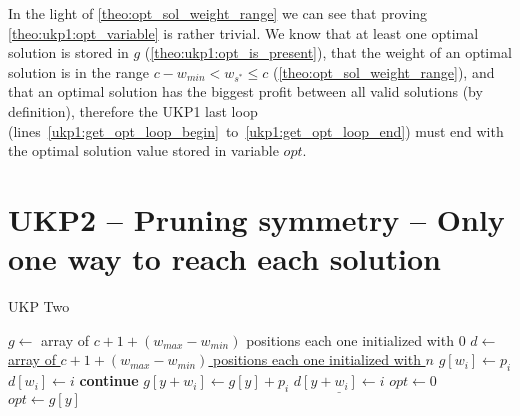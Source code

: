 \documentclass[12pt]{article}
\begin{document}
In the light of \autoref{theo:opt_sol_weight_range} we can see that proving \autoref{theo:ukp1:opt_variable} is rather trivial. We know that at least one optimal solution is stored in \(g\) (\autoref{theo:ukp1:opt_is_present}), that the weight of an optimal solution is in the range \(c - w_{min} < w_{s^*} \leq c\) (\autoref{theo:opt_sol_weight_range}), and that an optimal solution has the biggest profit between all valid solutions (by definition), therefore the UKP1 last loop (lines~\ref{ukp1:get_opt_loop_begin}~to~\ref{ukp1:get_opt_loop_end}) must end with the optimal solution value stored in variable \(opt\).

\section{UKP2 -- Pruning symmetry -- Only one way to reach each solution}

\begin{algorithm}[H]
\caption{UKP Two}\label{alg:ukp2}
\begin{algorithmic}[1]
  \State \(g \gets\) array of \(c + 1 + (w_{max} - w_{min})\) positions each one initialized with \(0\)\label{ukp2:create_g}
  \State \underline{\(d \gets\) array of \(c + 1 + (w_{max} - w_{min})\) positions each one initialized with \(n\)\label{ukp2:create_d}}
  \State %
  \label{ukp2:begin_trivial_bounds}
      \State \(g[w_i] \gets p_i\)
      \State \underline{\(d[w_i] \gets i\)}
    \EndIf
  \EndFor\label{ukp2:end_trivial_bounds}
  \State %
  \label{ukp2:main_ext_loop_begin}
    \label{ukp2:if_equal_to_zero}
    	\State \textbf{continue}
    \EndIf
    \State %
    \label{ukp2:main_inner_loop_begin}
      \label{ukp2:if_better_solution_begin}
        \State \(g[y + w_i] \gets g[y] + p_i\)
        \State \(\underline{d[y + w_i] \gets i}\)
      \EndIf\label{ukp2:if_better_solution_end}
    \EndFor\label{ukp2:main_inner_loop_end}
  \EndFor\label{ukp2:main_ext_loop_end}
  \State %
  \State \(opt \gets 0\)
  \label{ukp2:get_opt_loop_begin}
    \label{ukp2:opt_loop_if}
      \State \(opt \gets g[y]\)
    \EndIf
  \EndFor\label{ukp2:get_opt_loop_end}
\EndProcedure
\end{algorithmic}
\end{algorithm}
\end{document}

